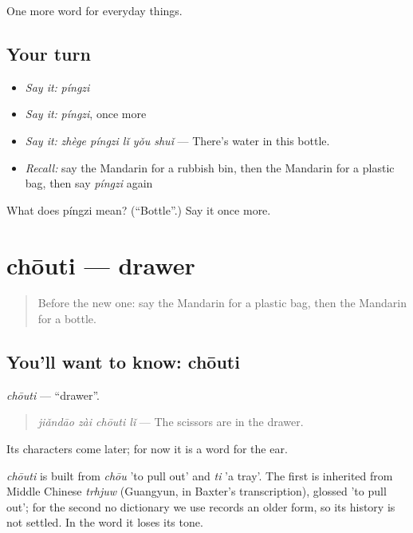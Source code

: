 \begin{grammarlens}[title={What you've built}]
One more word for everyday things.
\end{grammarlens}

\subsection*{Your turn}
\begin{itemize}
\raggedright
  \item \emph{Say it:} \emph{píngzi}
  \item \emph{Say it:} \emph{píngzi}, once more
  \item \emph{Say it:} \emph{zhège píngzi lǐ yǒu shuǐ} — There's water in this bottle.
  \item \emph{Recall:} say the Mandarin for a rubbish bin, then the Mandarin for a plastic bag, then say \emph{píngzi} again
\end{itemize}

\begin{tcolorbox}[breakable,colback=teal!4,colframe=teal!35!black,title={Before you move on}]
What does píngzi mean? (\textquotedblleft{}Bottle\textquotedblright{}.) Say it once more.
\end{tcolorbox}
\section[chōuti]{chōuti — drawer}

\label{lesson:ZH-C186-chouti}



\begin{quote}
Before the new one: say the Mandarin for a plastic bag, then the Mandarin for a bottle.
\end{quote}

\subsection*{You'll want to know: chōuti}
\emph{chōuti} — \textquotedblleft{}drawer\textquotedblright{}.

\begin{quote}
\emph{jiǎndāo zài chōuti lǐ} — The scissors are in the drawer.
\end{quote}

Its characters come later; for now it is a word for the ear.

\begin{cousinweb}
\emph{chōuti} is built from \emph{chōu} 'to pull out' and \emph{ti} 'a tray'. The first is inherited from Middle Chinese \emph{trhjuw} (Guangyun, in Baxter's transcription), glossed 'to pull out'; for the second no dictionary we use records an older form, so its history is not settled. In the word it loses its tone.
\end{cousinweb}

